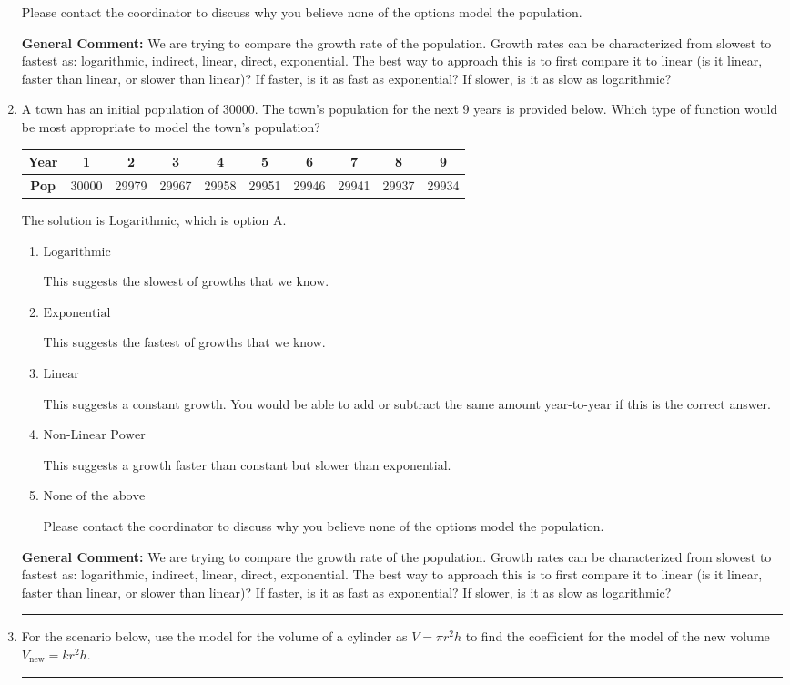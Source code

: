 \documentclass{extbook}[14pt]
\newcommand{\litem}[1]{\item #1

\rule{\textwidth}{0.4pt}}
\begin{document}
\begin{enumerate}
{\begin{enumerate}[label=\Alph*.]
Please contact the coordinator to discuss why you believe none of the options model the population.
\end{enumerate}

\textbf{General Comment:} We are trying to compare the growth rate of the population. Growth rates can be characterized from slowest to fastest as: logarithmic, indirect, linear, direct, exponential. The best way to approach this is to first compare it to linear (is it linear, faster than linear, or slower than linear)? If faster, is it as fast as exponential? If slower, is it as slow as logarithmic?
}
\litem{
A town has an initial population of 30000. The town's population for the next 9 years is provided below. Which type of function would be most appropriate to model the town's population?


\begin{tabular}{c|c|c|c|c|c|c|c|c|c}
\textbf{Year} &1 &2 &3 &4 &5 &6 &7 &8 &9\tabularnewline \hline
\textbf{Pop} &30000 &29979 &29967 &29958 &29951 &29946 &29941 &29937 &29934\end{tabular}The solution is \( \text{Logarithmic} \), which is option A.\begin{enumerate}[label=\Alph*.]
\item \( \text{Logarithmic} \)

This suggests the slowest of growths that we know.
\item \( \text{Exponential} \)

This suggests the fastest of growths that we know.
\item \( \text{Linear} \)

This suggests a constant growth. You would be able to add or subtract the same amount year-to-year if this is the correct answer.
\item \( \text{Non-Linear Power} \)

This suggests a growth faster than constant but slower than exponential.
\item \( \text{None of the above} \)

Please contact the coordinator to discuss why you believe none of the options model the population.
\end{enumerate}

\textbf{General Comment:} We are trying to compare the growth rate of the population. Growth rates can be characterized from slowest to fastest as: logarithmic, indirect, linear, direct, exponential. The best way to approach this is to first compare it to linear (is it linear, faster than linear, or slower than linear)? If faster, is it as fast as exponential? If slower, is it as slow as logarithmic?
}
\litem{
For the scenario below, use the model for the volume of a cylinder as $V = \pi r^2 h$ to find the coefficient for the model of the new volume $V_{\text{new}} = k r^2 h$.

}
\end{enumerate}
\end{document}
